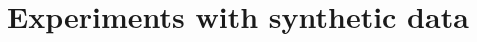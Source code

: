 \documentclass[letter,12pt]{article}
\DeclareMathOperator{\sign}{sign}
\begin{document}
 

\section{Experiments with synthetic data}\label{sec:synthetic}
\end{document}
